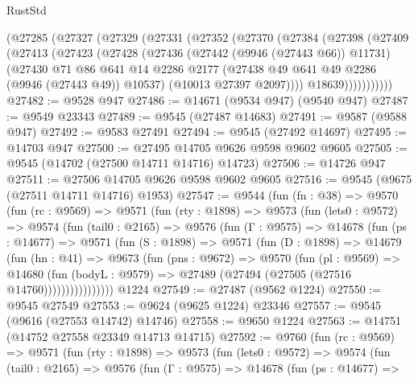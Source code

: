 \begin{lexlean}{RustStd}
\begin{coremodule}
    (@27285
      (@27327
        (@27329
          (@27331
            (@27352
              (@27370
                (@27384
                  (@27398
                    (@27409
                      (@27413
                        (@27423
                          (@27428
                            (@27436
                              (@27442 (@9946 (@27443 @66)) @11731)
                              (@27430
                                @71
                                @86
                                @641
                                @14
                                @2286
                                @2177
                                (@27438 @49 @641 @49 @2286 (@9946 (@27443 @49)) @10537)
                                (@10013 @27397 @2097))))
                          @18639)))))))))))
@27482 := @9528 @947
@27486 := @14671 (@9534 @947) (@9540 @947)
@27487 := @9549 @23343
@27489 := @9545 (@27487 @14683)
@27491 := @9587 (@9588 @947)
@27492 := @9583 @27491
@27494 := @9545 (@27492 @14697)
@27495 := @14703 @947
@27500 := @27495 @14705 @9626 @9598 @9602 @9605
@27505 := @9545 (@14702 (@27500 @14711 @14716) @14723)
@27506 := @14726 @947
@27511 := @27506 @14705 @9626 @9598 @9602 @9605
@27516 := @9545 (@9675 (@27511 @14711 @14716) @1953)
@27547 := @9544
    (fun (fn : @38) =>
    @9570
      (fun (rc : @9569) =>
      @9571
        (fun (rty : @1898) =>
        @9573
          (fun (lets0 : @9572) =>
          @9574
            (fun (tail0 : @2165) =>
            @9576
              (fun (Γ : @9575) =>
              @14678
                (fun (ps : @14677) =>
                @9571
                  (fun (S : @1898) =>
                  @9571
                    (fun (D : @1898) =>
                    @14679
                      (fun (hn : @41) =>
                      @9673
                        (fun (pns : @9672) =>
                        @9570
                          (fun (pl : @9569) =>
                          @14680
                            (fun (bodyL : @9579) =>
                            @27489 (@27494 (@27505 (@27516 @14760))))))))))))))))
    @1224
@27549 := @27487 (@9562 @1224)
@27550 := @9545 @27549
@27553 := @9624 (@9625 @1224) @23346
@27557 := @9545 (@9616 (@27553 @14742) @14746)
@27558 := @9650 @1224
@27563 := @14751 (@14752 @27558 @23349 @14713 @14715)
@27592 := @9760
    (fun (rc : @9569) =>
    @9571
      (fun (rty : @1898) =>
      @9573
        (fun (lets0 : @9572) =>
        @9574
          (fun (tail0 : @2165) =>
          @9576
            (fun (Γ : @9575) =>
            @14678
              (fun (ps : @14677) =>

\end{coremodule}
\end{lexlean}
